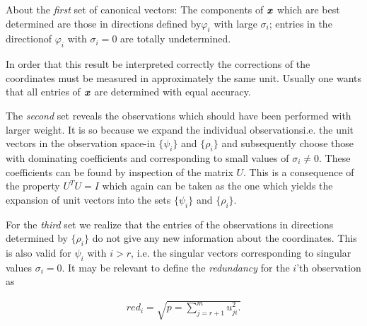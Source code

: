\begin{adjustwidth}{2em}{2em}
  About the \textit{first} set of canonical vectors: The components of $\textbf{\textit{x}}$ which are best determined are those in directions defined by$ \varphi_{i} $ with large $ \sigma_{i} $; entries in the directionof $ \varphi_{i} $ with $ \sigma_{i}=0 $ are totally undetermined.
\end{adjustwidth}
\begin{adjustwidth}{2em}{2em}
	In order that this result be interpreted correctly the corrections of the coordinates must be measured in approximately the same unit. Usually one wants that all entries of $\textbf{\textit{x}}$ are determined with equal accuracy.
\end{adjustwidth}
\begin{adjustwidth}{2em}{2em}
	The \textit{second} set reveals the observations which should have been performed with larger weight. It is so because we expand the individual observations\textthreequartersemdash i.e. the unit vectors in the observation space-in $ \{\psi_{i}\} $ and $ \{\rho_{i}\} $ and subsequently choose those with dominating coefficients and corresponding to small values of $ \sigma_{i}\neq0 $. These coefficients can be found by inspection of the matrix $U$. This is a consequence of the property $U^{T}U=I$ which again can be taken as the one which yields the expansion of unit vectors into the sets $ \{\psi_{i}\} $ and $ \{\rho_{i}\} $.
\end{adjustwidth}
\begin{adjustwidth}{2em}{2em}
For the \textit{third} set we realize that the entries of the observations in directions determined by $ \{\rho_{i}\} $ do not give any new information about the coordinates. This is also valid for $ \psi_{i} $ with $i>r$, i.e. the singular vectors corresponding to singular values
$ \sigma_{i}=0 $. It may be relevant to define the \textit{redundancy} for the $i$'th observation as
\end{adjustwidth}
\begin{align}
red_{i}=\sqrt{p = \sum_{j=r+1}^mu^{2}_{ji}.}
\end{align}